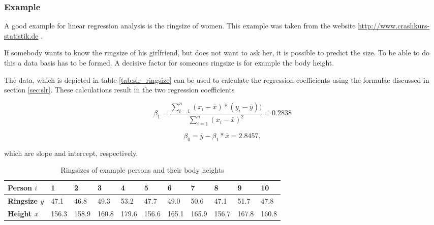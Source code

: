 \subsubsection{Example}

A good example for linear regression analysis is the ringsize of women. This example was taken from the website \url{http://www.crashkurs-statistik.de} \autocite{CrashkursSLR} \autocite{CrashkursMLR}.

If somebody wants to know the ringsize of his girlfriend, but does not want to ask her, it is possible to predict the size. To be able to do this a data basis has to be formed. A decisive factor for someones ringsize is for example the body height.

The data, which is depicted in table \vref{tab:slr_ringsize} can be used to calculate the regression coefficients using the formulae discussed in section \vref{sec:slr}. These calculations result in the two regression coefficients

\begin{equation}
    \beta_1 = \frac{\sum_{i=1}^{n} (x_i - \bar{x}) * (y_i - \bar{y}))}{\sum_{i=1}^{n} (x_i - \bar{x})^2} = 0.2838
\end{equation}

\begin{equation}
    \beta_0 = \bar{y} - \beta_1 * \bar{x} = 2.8457,
\end{equation}

which are slope and intercept, respectively.

\begin{table}[h]
    \centering
    \begin{tabular}{|l|l|l|l|l|l|l|l|l|l|l|}
    \hline
    \textbf{Person $ i $}    & \textbf{1} & \textbf{2} & \textbf{3} & \textbf{4} & \textbf{5} & \textbf{6} & \textbf{7} & \textbf{8} & \textbf{9} & \textbf{10} \\ \hline
    \textbf{Ringsize $ y $}  & 47.1       & 46.8       & 49.3       & 53.2       & 47.7       & 49.0       & 50.6       & 47.1       & 51.7       & 47.8        \\ \hline
    \textbf{Height $ x $}    & 156.3      & 158.9      & 160.8      & 179.6      & 156.6      & 165.1      & 165.9      & 156.7      & 167.8      & 160.8       \\ \hline
    \end{tabular}
    \caption{Ringsizes of example persons and their body heights}
    \label{tab:slr_ringsize}
\end{table}

